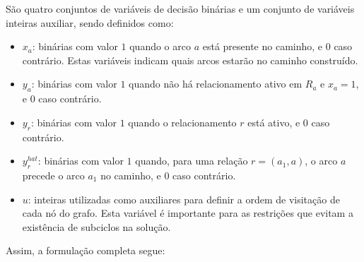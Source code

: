 São quatro conjuntos de variáveis de decisão binárias e um conjunto de variáveis inteiras auxiliar, sendo definidos como:

\begin{itemize}
    \item \textbf{$x_a$}: binárias com valor $1$ quando o arco $a$ está presente no caminho, e $0$ caso contrário. Estas variáveis indicam quais arcos estarão no caminho construído.
    \item \textbf{$y_a$}: binárias com valor $1$ quando não há relacionamento ativo em $R_a$ e $x_a=1$, e $0$ caso contrário.
    \item \textbf{$y_r$}: binárias com valor $1$ quando o relacionamento $r$ está ativo, e $0$ caso contrário.
    \item \textbf{$y^{hat}_{r}$}: binárias com valor $1$ quando, para uma relação $r = (a_1, a)$, o arco $a$ precede o arco $a_1$ no caminho, e $0$ caso contrário.
    \item \textbf{$u$}: inteiras utilizadas como auxiliares para definir a ordem de visitação de cada nó do grafo. Esta variável é importante para as restrições que evitam a existência de subciclos na solução.
\end{itemize}

Assim, a formulação completa segue:

